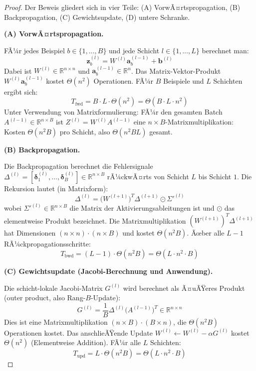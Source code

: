 ﻿\documentclass[a4paper,12pt]{article}
\theoremstyle{definition}
\begin{document}
\begin{proof}
	Der Beweis gliedert sich in vier Teile: (A) VorwÃ¤rtspropagation, (B) Backpropagation, (C) Gewichtsupdate, (D) untere Schranke.
	
	\medskip
	\textbf{(A) VorwÃ¤rtspropagation.}
	
	FÃ¼r jedes Beispiel $b \in \{1, \ldots, B\}$ und jede Schicht $l \in \{1, \ldots, L\}$ berechnet man:
	\[
	\boldsymbol{z}^{(l)}_b = W^{(l)} \boldsymbol{a}^{(l-1)}_b + \boldsymbol{b}^{(l)}
	\]
	Dabei ist $W^{(l)} \in \mathbb{R}^{n \times n}$ und $\boldsymbol{a}^{(l-1)}_b \in \mathbb{R}^n$. Das Matrix-Vektor-Produkt $W^{(l)} \boldsymbol{a}^{(l-1)}_b$ kostet $\Theta(n^2)$ Operationen. FÃ¼r $B$ Beispiele und $L$ Schichten ergibt sich:
	\[
	T_{\mathrm{fwd}} = B \cdot L \cdot \Theta(n^2) = \Theta(B \cdot L \cdot n^2)
	\]
	Unter Verwendung von Matrixformulierung: FÃ¼r den gesamten Batch $A^{(l-1)} \in \mathbb{R}^{n \times B}$ ist $Z^{(l)} = W^{(l)} A^{(l-1)}$ eine $n \times B$-Matrixmultiplikation: Kosten $\Theta(n^2 B)$ pro Schicht, also $\Theta(n^2 B L)$ gesamt.
	
	\medskip
	\textbf{(B) Backpropagation.}
	
	Die Backpropagation berechnet die Fehlersignale $\Delta^{(l)} = [\boldsymbol{\delta}^{(l)}_1, \ldots, \boldsymbol{\delta}^{(l)}_B] \in \mathbb{R}^{n \times B}$ rÃ¼ckwÃ¤rts von Schicht $L$ bis Schicht $1$. Die Rekursion lautet (in Matrixform):
	\[
	\Delta^{(l)} = \bigl(W^{(l+1)}\bigr)^T \Delta^{(l+1)} \odot \Sigma'^{(l)}
	\]
	wobei $\Sigma'^{(l)} \in \mathbb{R}^{n \times B}$ die Matrix der Aktivierungsableitungen ist und $\odot$ das elementweise Produkt bezeichnet. Die Matrixmultiplikation $(W^{(l+1)})^T \Delta^{(l+1)}$ hat Dimensionen $(n \times n) \cdot (n \times B)$ und kostet $\Theta(n^2 B)$. Ãœber alle $L-1$ RÃ¼ckpropagationsschritte:
	\[
	T_{\mathrm{bwd}} = (L-1) \cdot \Theta(n^2 B) = \Theta(L \cdot n^2 \cdot B)
	\]
	
	\medskip
	\textbf{(C) Gewichtsupdate (Jacobi-Berechnung und Anwendung).}
	
	Die schicht-lokale Jacobi-Matrix $G^{(l)}$ wird berechnet als Ã¤uÃŸeres Produkt (outer product, also Rang-$B$-Update):
	\[
	G^{(l)} = \frac{1}{B} \Delta^{(l)} \bigl(A^{(l-1)}\bigr)^T \in \mathbb{R}^{n \times n}
	\]
	Dies ist eine Matrixmultiplikation $(n \times B) \cdot (B \times n)$, die $\Theta(n^2 B)$ Operationen kostet. Das anschlieÃŸende Update $W^{(l)} \leftarrow W^{(l)} - \alpha G^{(l)}$ kostet $\Theta(n^2)$ (Elementweise Addition). FÃ¼r alle $L$ Schichten:
	\[
	T_{\mathrm{upd}} = L \cdot \Theta(n^2 B) = \Theta(L \cdot n^2 \cdot B)
	\]
	

\end{proof}
\end{document}
